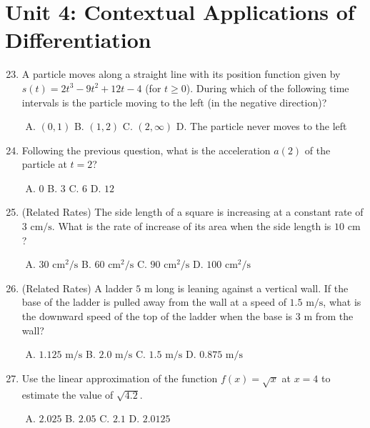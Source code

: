 \documentclass[11pt,a4paper]{article}
\begin{document}
\section*{Unit 4: Contextual Applications of Differentiation}

\begin{enumerate}[1.]
    \setcounter{enumi}{22}
    \item A particle moves along a straight line with its position function given by $s(t) = 2t^3 - 9t^2 + 12t - 4$ (for $t \ge 0$). During which of the following time intervals is the particle moving to the left (in the negative direction)?
    \begin{enumerate}[A.]
        \item $(0, 1)$ \qquad B. $(1, 2)$ \qquad C. $(2, \infty)$ \qquad D. The particle never moves to the left
    \end{enumerate}

    \item Following the previous question, what is the acceleration $a(2)$ of the particle at $t = 2$?
    \begin{enumerate}[A.]
        \item $0$ \qquad B. $3$ \qquad C. $6$ \qquad D. $12$
    \end{enumerate}

    \item (Related Rates) The side length of a square is increasing at a constant rate of $3\text{ cm/s}$. What is the rate of increase of its area when the side length is $10\text{ cm}$?
    \begin{enumerate}[A.]
        \item $30\text{ cm}^2/\text{s}$ \qquad B. $60\text{ cm}^2/\text{s}$ \qquad C. $90\text{ cm}^2/\text{s}$ \qquad D. $100\text{ cm}^2/\text{s}$
    \end{enumerate}

    \item (Related Rates) A ladder $5\text{ m}$ long is leaning against a vertical wall. If the base of the ladder is pulled away from the wall at a speed of $1.5\text{ m/s}$, what is the downward speed of the top of the ladder when the base is $3\text{ m}$ from the wall?
    \begin{enumerate}[A.]
        \item $1.125\text{ m/s}$ \qquad B. $2.0\text{ m/s}$ \qquad C. $1.5\text{ m/s}$ \qquad D. $0.875\text{ m/s}$
    \end{enumerate}

    \item Use the linear approximation of the function $f(x) = \sqrt{x}$ at $x = 4$ to estimate the value of $\sqrt{4.2}$.
    \begin{enumerate}[A.]
        \item $2.025$ \qquad B. $2.05$ \qquad C. $2.1$ \qquad D. $2.0125$
    \end{enumerate}


\end{enumerate}
\end{document}
